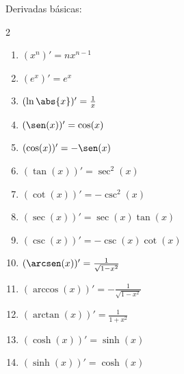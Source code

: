 \documentclass{article}
\begin{document}
{\large Derivadas básicas:}
\begin{multicols}{2}
  \begin{enumerate}
    \item $(x^n)' = nx^{n-1}$
    \item $(e^x)' = e^x$
    \item $(\ln\abs{x})' = \frac{1}{x}$
    \item $(\sen(x))' = \cos(x)$
    \item $(\cos(x))' = -\sen(x)$
    \item $(\tan(x))' = \sec^2(x)$
    \item $(\cot(x))' = -\csc^2(x)$
    \item $(\sec(x))' = \sec(x)\tan(x)$
    \item $(\csc(x))' = -\csc(x)\cot(x)$
    \item $(\arcsen(x))' = \frac{1}{\sqrt{1-x^2}}$
    \item $(\arccos(x))' = -\frac{1}{\sqrt{1-x^2}}$
    \item $(\arctan(x))' = \frac{1}{1+x^2}$
    \item $(\cosh(x))' = \sinh(x)$
    \item $(\sinh(x))' = \cosh(x)$
  \end{enumerate}
\end{multicols}
\vspace{2mm}

\end{document}
